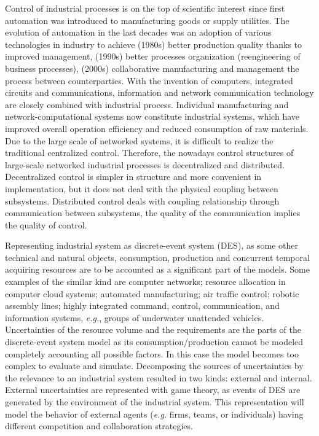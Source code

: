 \documentclass[conference]{IEEEtran}
\begin{document}
Control of industrial processes is on the top of scientific interest since first automation was introduced to manufacturing goods or supply utilities. The evolution of automation in the last decades was an adoption of various technologies in industry to achieve (1980s) better production quality thanks to improved management, (1990s) better processes organization (reengineering of business processes), (2000s) collaborative manufacturing and management the process between counterparties. With the invention of computers, integrated circuits and communications, information and network communication technology are closely combined with industrial process. Individual manufacturing and network-computational systems now constitute industrial systems, which have improved overall operation efficiency and reduced consumption of raw materials. Due to the large scale of networked systems, it is difficult to realize the traditional centralized control. Therefore, the nowadays control structures of large-scale networked industrial processes is decentralized and distributed. Decentralized control is simpler in structure and more convenient in implementation, but it does not deal with the physical coupling between subsystems. Distributed control deals with coupling relationship through communication between subsystems, the quality of the communication implies the quality of control.


Representing industrial system as discrete-event system (DES), as some other technical and natural objects, consumption, production and concurrent temporal acquiring resources are to be accounted as a significant part of the models.  Some examples of the similar kind are computer networks; resource allocation in computer cloud systems; automated manufacturing; air traffic control; robotic assembly lines; highly integrated command, control, communication, and information systems, \emph{e.g.}, groups of underwater unattended vehicles.  Uncertainties of the resource volume and the requirements are the parts of the discrete-event system model as its consumption/production cannot be modeled completely accounting all possible factors. In this case the model becomes too complex to evaluate and simulate. Decomposing the sources of uncertainties by the relevance to an industrial system resulted in two kinds: external and internal.  External uncertainties are represented with game theory, as events of DES are generated by the environment of the industrial system.  This representation will model the behavior of external agents (\emph{e.g.} firms, teams, or individuals) having different competition and collaboration strategies.
\end{document}
